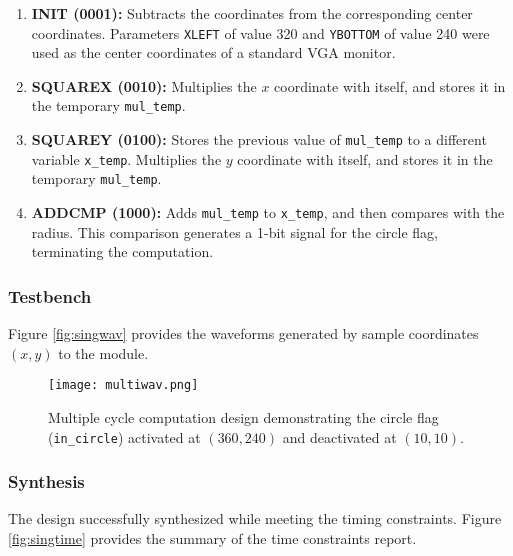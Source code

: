\documentclass[paper=usletter, fontsize=12pt]{article}
\begin{document}
        \begin{enumerate}

            \item \textbf{INIT (0001): } Subtracts the coordinates from the
            corresponding center coordinates. Parameters \texttt{XLEFT} of
            value 320 and \texttt{YBOTTOM} of value 240 were used as the center
            coordinates of a standard VGA monitor.

            \item \textbf{SQUAREX (0010): } Multiplies the $x$ coordinate with
            itself, and stores it in the temporary \texttt{mul\_temp}.

            \item \textbf{SQUAREY (0100): } Stores the previous value of
            \texttt{mul\_temp} to a different variable \texttt{x\_temp}.
            Multiplies the $y$ coordinate with itself, and stores it in the
            temporary \texttt{mul\_temp}.

            \item \textbf{ADDCMP (1000): } Adds \texttt{mul\_temp} to
            \texttt{x\_temp}, and then compares with the radius. This
            comparison generates a 1-bit signal for the circle flag,
            terminating the computation.

        \end{enumerate}

        \subsubsection{Testbench} Figure \ref{fig:singwav} provides the
        waveforms generated by sample coordinates $(x, y)$ to the module.
        \begin{figure}[ht]
            \begin{center}
                \texttt{[image: multiwav.png]}
                \caption{Multiple cycle computation design demonstrating the
                circle flag (\texttt{in\_circle}) activated at $(360, 240)$ and
                deactivated at $(10,10)$.}
                \label{fig:multiwav}
            \end{center}
        \end{figure}

        \subsubsection{Synthesis} The design successfully synthesized while
        meeting the timing constraints. Figure \ref{fig:singtime} provides the
        summary of the time constraints report.
\end{document}

